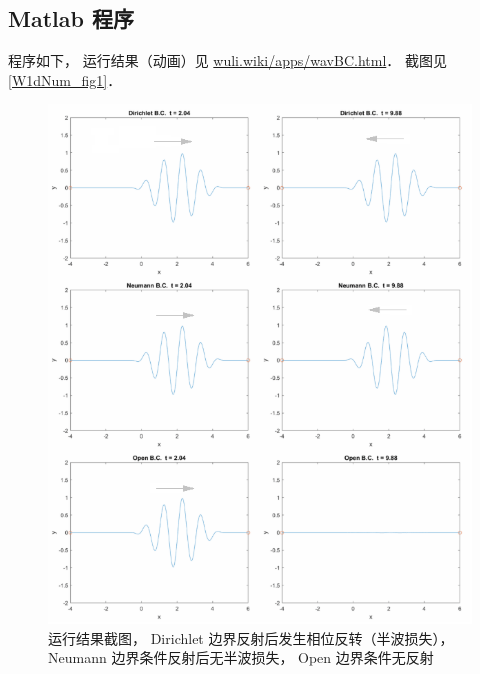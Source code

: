 \subsection{Matlab 程序}
程序如下， 运行结果（动画）见 \href{http://wuli.wiki/apps/wavBC.html}{wuli.wiki/apps/wavBC.html}． 截图见\autoref{W1dNum_fig1}．

\begin{figure}[ht]
\centering
\includegraphics[width=16cm]{./figures/W1dNum1.png}
\caption{运行结果截图， Dirichlet 边界反射后发生相位反转（半波损失）， Neumann 边界条件反射后无半波损失， Open 边界条件无反射} \label{W1dNum_fig1}
\end{figure}
